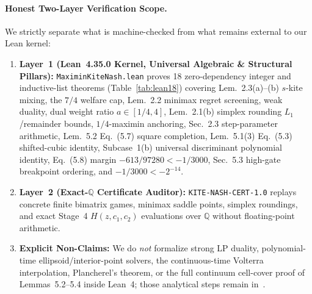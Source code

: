 \documentclass[10pt,twocolumn]{article}
\newcommand{\QQ}{\mathbb{Q}}
\begin{document}
\paragraph{Honest Two-Layer Verification Scope.}
We strictly separate what is machine-checked from what remains external to our Lean kernel:
\begin{enumerate}[leftmargin=1.3em,itemsep=1pt,topsep=2pt]
  \item \textbf{Layer~1 (Lean~4.35.0 Kernel, Universal Algebraic \& Structural Pillars):} \texttt{MaximinKiteNash.lean} proves 18 zero-dependency integer and inductive-list theorems (Table~\ref{tab:lean18}) covering Lem.~2.3(a)--(b) $s$-kite mixing, the $7/4$ welfare cap, Lem.~2.2 minimax regret screening, weak duality, dual weight ratio $a\in[1/4,4]$, Lem.~2.1(b) simplex rounding $L_1$/remainder bounds, $1/4$-maximin anchoring, Sec.~2.3 step-parameter arithmetic, Lem.~5.2 Eq.~(5.7) square completion, Lem.~5.1(3) Eq.~(5.3) shifted-cubic identity, Subcase~1(b) universal discriminant polynomial identity, Eq.~(5.8) margin $-613/97280 < -1/3000$, Sec.~5.3 high-gate breakpoint ordering, and $-1/3000 < -2^{-14}$.
  \item \textbf{Layer~2 (Exact-$\QQ$ Certificate Auditor):} \texttt{KITE-NASH-CERT-1.0} replays concrete finite bimatrix games, minimax saddle points, simplex roundings, and exact Stage~4 $H(z,c_1,c_2)$ evaluations over $\QQ$ without floating-point arithmetic.
  \item \textbf{Explicit Non-Claims:} We do \emph{not} formalize strong LP duality, polynomial-time ellipsoid/interior-point solvers, the continuous-time Volterra interpolation, Plancherel's theorem, or the full continuum cell-cover proof of Lemmas~5.2--5.4 inside Lean~4; those analytical steps remain in~\cite{cogentic2026maximin}.
\end{enumerate}
\end{document}
